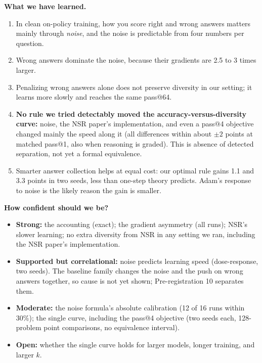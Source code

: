 \documentclass[11pt]{article}
\begin{document}
\textbf{What we have learned.}
\begin{enumerate}[leftmargin=*,itemsep=2pt]
\item In clean on-policy training, how you score right and wrong answers matters mainly through \emph{noise}, and the noise is predictable from four numbers per question.
\item Wrong answers dominate the noise, because their gradients are 2.5 to 3 times larger.
\item Penalizing wrong answers alone does not preserve diversity in our setting; it learns more slowly and reaches the same pass@64.
\item \textbf{No rule we tried detectably moved the accuracy-versus-diversity curve:} noise, the NSR paper's implementation, and even a pass@4 objective changed mainly the speed along it (all differences within about $\pm2$ points at matched pass@1, also when reasoning is graded). This is absence of detected separation, not yet a formal equivalence.
\item Smarter answer collection helps at equal cost: our optimal rule gains 1.1 and 3.3 points in two seeds, less than one-step theory predicts. Adam's response to noise is the likely reason the gain is smaller.
\end{enumerate}

\textbf{How confident should we be?}
\begin{itemize}[leftmargin=*,itemsep=1pt]
\item \textbf{Strong:} the accounting (exact); the gradient asymmetry (all runs); NSR's slower learning; no extra diversity from NSR in any setting we ran, including the NSR paper's implementation.\item \textbf{Supported but correlational:} noise predicts learning speed (dose-response, two seeds). The baseline family changes the noise and the push on wrong answers together, so cause is not yet shown; Pre-registration 10 separates them.
\item \textbf{Moderate:} the noise formula's absolute calibration (12 of 16 runs within 30\%); the single curve, including the pass@4 objective (two seeds each, 128-problem point comparisons, no equivalence interval).
\item \textbf{Open:} whether the single curve holds for larger models, longer training, and larger $k$.
\end{itemize}
\end{document}
